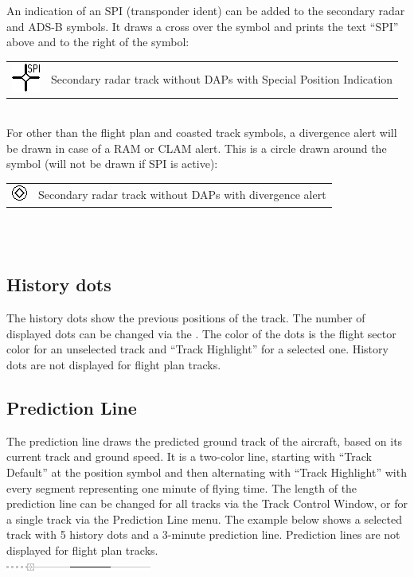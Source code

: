 \documentclass[11pt,a4paper,oldfontcommands]{memoir}
\begin{document}
An indication of an SPI (transponder ident) can be added to the secondary radar and ADS-B symbols. It
draws a cross over the symbol and prints the text “SPI” above and to the right of the symbol:\\
\begin{tabular}{p{5cm}p{5cm}}
\includegraphics{img/rps_spi.png} & Secondary radar track without DAPs with Special Position Indication
\end{tabular}\\
For other than the flight plan and coasted track symbols, a divergence alert will be drawn in case of a RAM
or CLAM alert. This is a circle drawn around the symbol (will not be drawn if SPI is active):\\
\begin{tabular}{p{5cm}p{5cm}}
\includegraphics{img/rps_divalert.png}& Secondary radar track without DAPs with divergence alert
\end{tabular}\\\\

\subsection{History dots}
The history dots show the previous positions of the track. The number of displayed dots can be changed via
the \textit{}. The color of the dots is the flight sector color for an unselected track and “Track
Highlight” for a selected one. History dots are not displayed for flight plan tracks.\\

\subsection{Prediction Line}
The prediction line draws the predicted ground track of the aircraft, based on its current track and ground
speed. It is a two-color line, starting with “Track Default” at the position symbol and then alternating with “Track Highlight” with every segment representing one minute of flying time. The length of the prediction line can be
changed for all tracks via the Track Control Window, or for a single track via the Prediction Line menu. The
example below shows a selected track with 5 history dots and a 3-minute prediction line. Prediction lines
are not displayed for flight plan tracks.\\
\includegraphics{img/rps_predline+history_selected.png}\\
\end{document}
